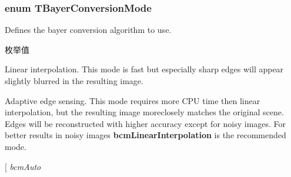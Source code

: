 \hypertarget{group___common_interface_gab19b45fcaaa584be84a99a3d7098b055}{
\subsubsection[{T\+Bayer\+Conversion\+Mode}]{\setlength{\rightskip}{0pt plus 5cm}enum {\bf T\+Bayer\+Conversion\+Mode}}}\label{group___common_interface_gab19b45fcaaa584be84a99a3d7098b055}


Defines the bayer conversion algorithm to use. 

\begin{Desc}
\item[枚举值]\par
\begin{description}
\item[{\em 
\hypertarget{group___common_interface_ggab19b45fcaaa584be84a99a3d7098b055a63ea2b0afc88951809e9aa120bc93eba}{bcm\+Linear\+Interpolation}\label{group___common_interface_ggab19b45fcaaa584be84a99a3d7098b055a63ea2b0afc88951809e9aa120bc93eba}
}]Linear interpolation. This mode is fast but especially sharp edges will appear slightly blurred in the resulting image. \item[{\em 
\hypertarget{group___common_interface_ggab19b45fcaaa584be84a99a3d7098b055a229781c452750addaa92ee6106c1c629}{bcm\+Adaptive\+Edge\+Sensing}\label{group___common_interface_ggab19b45fcaaa584be84a99a3d7098b055a229781c452750addaa92ee6106c1c629}
}]Adaptive edge sensing. This mode requires more C\+P\+U time then linear interpolation, but the resulting image moreclosely matches the original scene. Edges will be reconstructed with higher accuracy except for noisy images. For better results in noisy images {\bfseries bcm\+Linear\+Interpolation} is the recommended mode. \item[{\em 
\hypertarget{group___common_interface_ggab19b45fcaaa584be84a99a3d7098b055ad6a56f2b00e655567450658a86988d5d}{bcm\+Auto}\label{group___common_interface_ggab19b45fcaaa584be84a99a3d7098b055ad6a56f2b00e655567450658a86988d5d}
}
\end{description}
\end{Desc}
